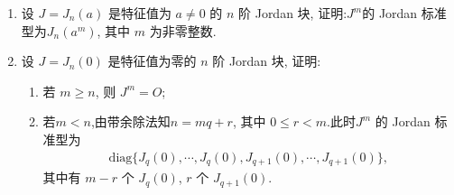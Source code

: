 \documentclass[../../main.tex]{subfiles}%
\begin{document}
\begin{proposition}\label{proposition:Jordan块的m次方的Jordan标准型}
\begin{enumerate}
\item 设 $J = J_n(a)$ 是特征值为 $a \neq 0$ 的 $n$ 阶 Jordan 块, 证明:$J^m$的 Jordan 标准型为$J_n(a^m)$, 其中 $m$ 为非零整数.

\item 设 $J = J_n(0)$ 是特征值为零的 $n$ 阶 Jordan 块, 证明:
\begin{enumerate}[(1)]
\item 若 $m \geqslant  n$, 则 $J^m = O$;

\item 若$m < n$,由带余除法知$n = mq + r$, 其中 $0 \leqslant  r < m$.此时$J^m$ 的 Jordan 标准型为
\begin{align*}
\mathrm{diag}\{J_q(0),\cdots,J_q(0),J_{q + 1}(0),\cdots,J_{q + 1}(0)\},
\end{align*}
其中有 $m - r$ 个 $J_q(0)$, $r$ 个 $J_{q + 1}(0)$. 
\end{enumerate}
\end{enumerate}
\end{proposition}
\end{document}

